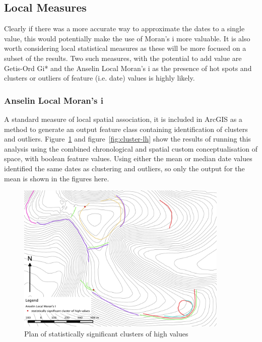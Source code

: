 \subsection{Local Measures}
Clearly if there was a more accurate way to approximate the dates to a single value, this would potentially make the use of Moran's i more valuable. It is also worth considering local statistical measures as these will be more focused on a subset of the results. Two such measures, with the potential to add value are Getis-Ord Gi* and the Anselin Local Moran's i as the presence of hot spots and clusters or outliers of feature (i.e. date) values is highly likely.
 
\subsubsection{Anselin Local Moran's i}
A standard measure of local spatial association, it is included in ArcGIS as a method to generate an output feature class containing identification of clusters and outliers. Figure~\ref{fig:cluster-hh} and figure~\ref{fig:cluster-lh} show the results of running this analysis using the combined chronological and spatial custom conceptualisation of space, with boolean feature values. Using either the mean or median date values identified the same dates as clustering and outliers, so only the output for the mean is shown in the figures here.

\begin{figure} 
\centering
	\includegraphics[width=0.9\textwidth]{figures/cluster-HH}
  \caption{Plan of statistically significant clusters of high values}
  \label{fig:cluster-hh}
\end{figure}

